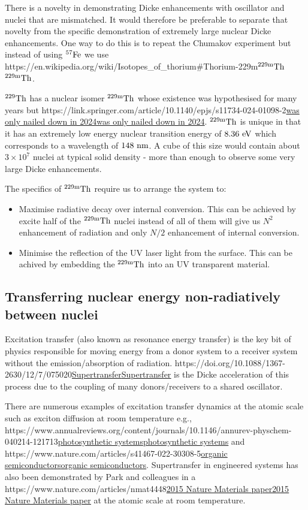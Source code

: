 \documentclass[
]{article}
\let\oldhref\href
\renewcommand{\href}[2]{\ifx#1\urlprefix\oldhref{#1}{#2}\else\uline{\oldhref{#1}{#2}}\fi}
\renewcommand{\[}{\begin{equation}}
\renewcommand{\]}{\end{equation}}
\providecommand{\tightlist}{%
  \setlength{\itemsep}{0pt}\setlength{\parskip}{0pt}}
\begin{document}
There is a novelty in demonstrating Dicke enhancements with oscillator
and nuclei that are mismatched. It would therefore be preferable to
separate that novelty from the specific demonstration of extremely large
nuclear Dicke enhancements. One way to do this is to repeat the Chumakov
experiment but instead of using \(\rm ^{57}Fe\) we use
\href{https://en.wikipedia.org/wiki/Isotopes_of_thorium\#Thorium-229m}{\(\rm ^{229m}Th\)}.

\(\rm ^{229}Th\) has a nuclear isomer \(\rm ^{229m}Th\) whose existence
was hypothesised for many years but
\href{https://link.springer.com/article/10.1140/epjs/s11734-024-01098-2}{was
only nailed down in 2024}. \(\rm ^{229m}Th\) is unique in that it has an
extremely low energy nuclear transition energy of \(8.36 \ \rm eV\)
which corresponds to a wavelength of \(148 \ \rm nm\). A cube of this
size would contain about \(3\times 10^7\) nuclei at typical solid
density - more than enough to observe some very large Dicke
enhancements.

The specifics of \(\rm ^{229m}Th\) require us to arrange the system to:

\begin{itemize}
\tightlist
\item
  Maximise radiative decay over internal conversion. This can be
  achieved by excite half of the \(\rm ^{229m}Th\) nuclei instead of all
  of them will give us \(N^2\) enhancement of radiation and only \(N/2\)
  enhancement of internal conversion.
\item
  Minimise the reflection of the UV laser light from the surface. This
  can be achived by embedding the \(\rm ^{229m}Th\) into an UV
  transparent material.
\end{itemize}

\subsection{Transferring nuclear energy non-radiatively between
nuclei}\label{transferring-nuclear-energy-non-radiatively-between-nuclei}

Excitation transfer (also known as resonance energy transfer) is the key
bit of physics responsible for moving energy from a donor system to a
receiver system without the emission/absorption of radiation.
\href{https://doi.org/10.1088/1367-2630/12/7/075020}{Supertransfer} is
the Dicke acceleration of this process due to the coupling of many
donors/receivers to a shared oscillator.

There are numerous examples of excitation transfer dynamics at the
atomic scale such as exciton diffusion at room temperature e.g.,
\href{https://www.annualreviews.org/content/journals/10.1146/annurev-physchem-040214-121713}{photosynthetic
systems} and
\href{https://www.nature.com/articles/s41467-022-30308-5}{organic
semiconductors}. Supertransfer in engineered systems has also been
demonstrated by Park and colleagues in a
\href{https://www.nature.com/articles/nmat4448}{2015 Nature Materials
paper} at the atomic scale at room temperature.
\end{document}
